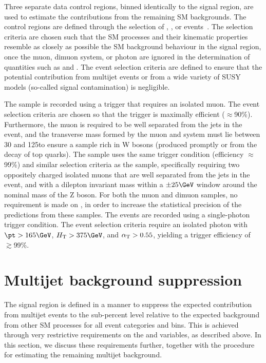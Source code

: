 Three separate data control regions, binned identically to the signal
region, are used to estimate the contributions from the remaining SM
backgrounds. The control regions are defined through the selection of
\mj, \mmj, or \gj events~\cite{RA1Paper2012}. The selection criteria
are chosen such that the SM processes and their kinematic properties
resemble as closely as possible the SM background behaviour in the
signal region, once the muon, dimuon system, or photon are ignored in
the determination of quantities such as \scalht and \alphat. The event
selection criteria are defined to ensure that the potential
contribution from multijet events or from a wide variety of SUSY
models (\ie so-called signal contamination) is negligible.

The \mj sample is recorded using a trigger that requires an isolated
muon. The event selection criteria are chosen so that the trigger is
maximally efficient ($\approx$90\%). Furthermore, the muon is required
to be well separated from the jets in the event, and the transverse
mass formed by the muon and \ETmiss system must lie between 30 and
125\GeV to ensure a sample rich in W bosons (produced promptly or from
the decay of top quarks). The \mmj sample uses the same trigger
condition (efficiency $\approx$99\%) and similar selection criteria as
the \mj sample, specifically requiring two oppositely charged isolated
muons that are well separated from the jets in the event, and with a
dilepton invariant mass within a $\pm 25\GeV$ window around the
nominal mass of the Z boson. For both the muon and dimuon samples, no
requirement is made on \alphat, in order to increase the statistical
precision of the predictions from these samples.  The \gj events are
recorded using a single-photon trigger condition. The event selection
criteria require an isolated photon with $\pt > 165\GeV$, $\scalht >
375\GeV$, and $\alpha_\mathrm{T} > 0.55$, yielding a trigger efficiency
of~$\gtrsim$99\%.

\section{Multijet background suppression \label{sec:multijet}}

The signal region is defined in a manner to suppress the expected
contribution from multijet events to the sub-percent level relative to
the expected background from other SM processes for all event
categories and \scalht bins. This is achieved through very restrictive
requirements on the \alphat and \dphi variables, as described
above. In this section, we discuss these requirements further,
together with the procedure for estimating the remaining multijet
background.

